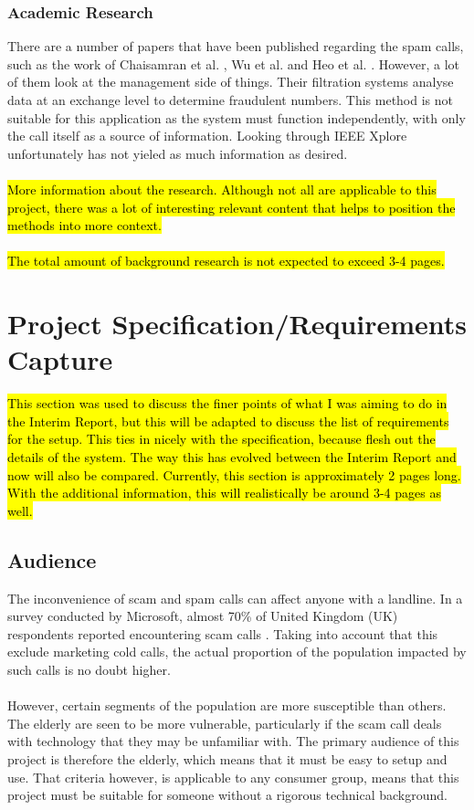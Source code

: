 \documentclass[12pt,a4paper]{report}
\begin{document}
\subsection{Academic Research}
There are a number of papers that have been published regarding the spam calls, such as the work of Chaisamran et al. \cite{chaisa}, Wu et al. \cite{wu} and Heo et al. \cite{heo}. However, a lot of them look at the management side of things. Their filtration systems analyse data at an exchange level to determine fraudulent numbers. This method is not suitable for this application as the system must function independently, with only the call itself as a source of information. Looking through IEEE Xplore unfortunately has not yieled as much information as desired.
\\\\
\hl{More information about the research. Although not all are applicable to this project, there was a lot of interesting relevant content that helps to position the methods into more context. }
\\\\
\hl{The total amount of background research is not expected to exceed 3-4 pages.}

\chapter{Project Specification/Requirements Capture}

\hl{This section was used to discuss the finer points of what I was aiming to do in the Interim Report, but this will be adapted to discuss the list of requirements for the setup. This ties in nicely with the specification, because flesh out the details of the system. The way this has evolved between the Interim Report and now will also be compared. Currently, this section is approximately 2 pages long. With the additional information, this will realistically be around 3-4 pages as well. }

\section{Audience}
The inconvenience of scam and spam calls can affect anyone with a landline. In a survey conducted by Microsoft, almost 70\% of United Kingdom (UK) respondents reported encountering scam calls \cite{microsoft-survey}. Taking into account that this exclude marketing cold calls, the actual proportion of the population impacted by such calls is no doubt higher.
\\\\
However, certain segments of the population are more susceptible than others. The elderly are seen to be more vulnerable, particularly if the scam call deals with technology that they may be unfamiliar with. The primary audience of this project is therefore the elderly, which means that it must be easy to setup and use. That criteria however, is applicable to any consumer group, means that this project must be suitable for someone without a rigorous technical background.
\end{document}

